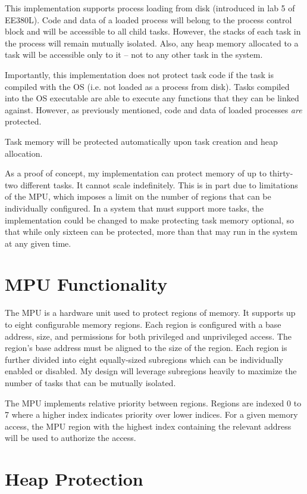 This implementation supports process loading from disk (introduced in lab 5 of EE380L). Code and data of a loaded process will belong to the process control block and will be accessible to all child tasks. However, the stacks of each task in the process will remain mutually isolated. Also, any heap memory allocated to a task will be accessible only to it -- not to any other task in the system.

Importantly, this implementation does not protect task code if the task is compiled with the OS (i.e. not loaded as a process from disk). Tasks compiled into the OS executable are able to execute any functions that they can be linked against. However, as previously mentioned, code and data of loaded processes \textit{are} protected.

Task memory will be protected automatically upon task creation and heap allocation.

As a proof of concept, my implementation can protect memory of up to thirty-two different tasks. It cannot scale indefinitely. This is in part due to limitations of the MPU, which imposes a limit on the number of regions that can be individually configured. In a system that must support more tasks, the implementation could be changed to make protecting task memory optional, so that while only sixteen can be protected, more than that may run in the system at any given time.

\section{MPU Functionality}

The MPU is a hardware unit used to protect regions of memory. It supports up to eight configurable memory regions. Each region is configured with a base address, size, and permissions for both privileged and unprivileged access. The region's base address must be aligned to the size of the region. Each region is further divided into eight equally-sized subregions which can be individually enabled or disabled. My design will leverage subregions heavily to maximize the number of tasks that can be mutually isolated.

The MPU implements relative priority between regions. Regions are indexed 0 to 7 where a higher index indicates priority over lower indices. For a given memory access, the MPU region with the highest index containing the relevant address will be used to authorize the access.

\section{Heap Protection}

